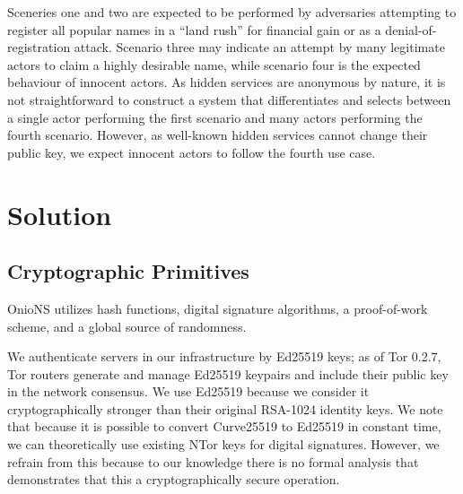 \documentclass[USenglish,oneside,twocolumn]{article}
\begin{document}
Sceneries one and two are expected to be performed by adversaries attempting to register all popular names in a ``land rush'' for financial gain or as a denial-of-registration attack. Scenario three may indicate an attempt by many legitimate actors to claim a highly desirable name, while scenario four is the expected behaviour of innocent actors. As hidden services are anonymous by nature, it is not straightforward to construct a system that differentiates and selects between a single actor performing the first scenario and many actors performing the fourth scenario. However, as well-known hidden services cannot change their public key, we expect innocent actors to follow the fourth use case.

\section{Solution}
\label{sec:Solution}

\subsection{Cryptographic Primitives}
\label{sec:cryptoPrimitives}

OnioNS utilizes hash functions, digital signature algorithms, a proof-of-work scheme, and a global source of randomness.

We authenticate servers in our infrastructure by Ed25519 \cite{bernstein2011high} keys; as of Tor 0.2.7, Tor routers generate and manage Ed25519 keypairs and include their public key in the network consensus. We use Ed25519 because we consider it cryptographically stronger than their original RSA-1024 identity keys. We note that because it is possible to convert Curve25519 \cite{bernstein2006curve25519} to Ed25519 in constant time, we can theoretically use existing NTor \cite{goldberg2013anonymity} keys for digital signatures. However, we refrain from this because to our knowledge there is no formal analysis that demonstrates that this a cryptographically secure operation. %
\end{document}
